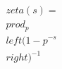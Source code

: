 \documentclass[preview]{standalone}
\begin{document}
\begin{align*}
\quad\\zeta(s) = \quad\\prod_{p} \quad\\left(1 - p^{-s}\quad\\right)^{-1}
\end{align*}
\end{document}

